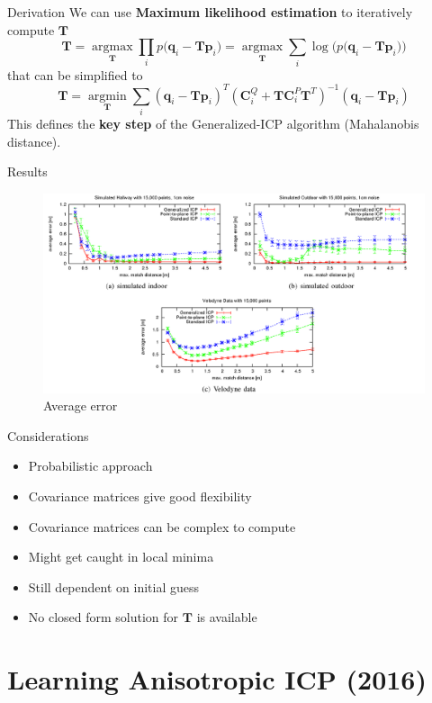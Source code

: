 \documentclass[aspectratio=1610]{beamer}
\newcommand*\pro{%
  \item[\color{ProGreen}\scalebox{1.5}{\faThumbsOUp}]}
\newcommand*\con{%
  \item[\color{ConRed}\scalebox{1.5}{\faThumbsODown}]}
\newcommand{\Ealign}{\bm{q}_i-\bm{T}\bm{p}_i}
\DeclareMathOperator*{\argmin}{argmin}
\DeclareMathOperator*{\argmax}{argmax}
\begin{document}
\begin{frame}[allowframebreaks]{Derivation}
We can use \textbf{Maximum likelihood estimation} to iteratively compute $\bm{T}$
\[ \bm{T} = \argmax\limits_{\bm{T}} \prod\limits_i p\big( \Ealign \big)
     = \argmax\limits_{\bm{T}} \sum\limits_i \log \big(
     p\big( \Ealign \big) \big)
\]
that can be simplified to
\begin{equation}
\bm{T} = \argmin\limits_{\bm{T}} \sum\limits_i (\Ealign)^T ( \bm{C}_i^Q+ \bm{T} \bm{C}_i^P \bm{T}^T)^{-1} (\Ealign)
\end{equation}
This defines the \textbf{key step} of the Generalized-ICP algorithm (Mahalanobis distance).
\end{frame}

\begin{frame}{Results}
\begin{figure}[htbp]
\begin{center}
\includegraphics[width=\textwidth,keepaspectratio]{imgs/gicp.png}
\caption{Average error}
\label{fig:gicp}
\end{center}
\end{figure}
\end{frame}

\begin{frame}{Considerations}
\begin{itemize}[wide, labelsep=2em]
  \pro Probabilistic approach
  \pro Covariance matrices give good flexibility
  \con Covariance matrices can be complex to compute
  \con Might get caught in local minima
  \con Still dependent on initial guess
  \con No closed form solution for $\bm{T}$ is available
\end{itemize}
\end{frame}

\section{Learning Anisotropic ICP (2016)}
\end{document}
